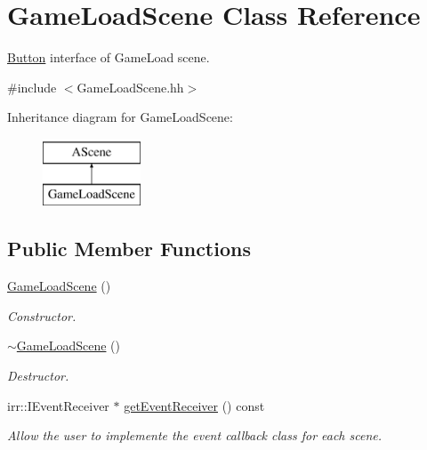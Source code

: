 \hypertarget{classGameLoadScene}{}\section{Game\+Load\+Scene Class Reference}
\label{classGameLoadScene}


\hyperlink{classButton}{Button} interface of Game\+Load scene.  




{\ttfamily \#include $<$Game\+Load\+Scene.\+hh$>$}

Inheritance diagram for Game\+Load\+Scene\+:\begin{figure}[H]
\begin{center}
\leavevmode
\includegraphics[height=2.000000cm]{classGameLoadScene}
\end{center}
\end{figure}
\subsection*{Public Member Functions}
\begin{DoxyCompactItemize}
\item 
\hyperlink{classGameLoadScene_a225786d3826577aa3743164b6262dc2b}{Game\+Load\+Scene} ()
\begin{DoxyCompactList}\small\item\em Constructor. \end{DoxyCompactList}\item 
\hyperlink{classGameLoadScene_a39c0f378455520c08d21e0642f35cd9b}{$\sim$\+Game\+Load\+Scene} ()
\begin{DoxyCompactList}\small\item\em Destructor. \end{DoxyCompactList}\item 
irr\+::\+I\+Event\+Receiver $\ast$ \hyperlink{classGameLoadScene_a81807790ad65bd2cf97a1e543cae2b74}{get\+Event\+Receiver} () const
\begin{DoxyCompactList}\small\item\em Allow the user to implemente the event callback class for each scene. \end{DoxyCompactList}\end{DoxyCompactItemize}


